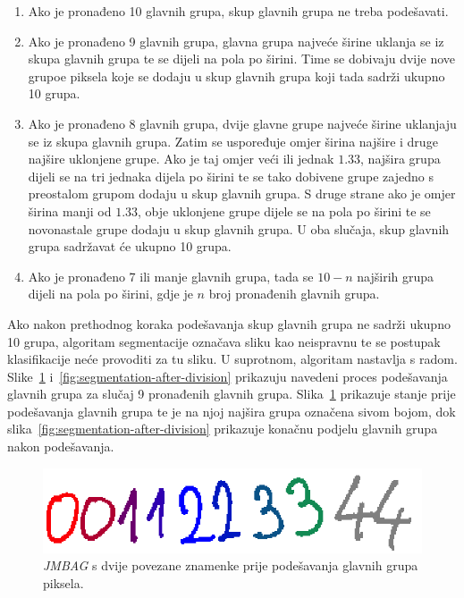 \begin{enumerate}
    \item Ako je pronađeno 10 glavnih grupa, skup glavnih grupa ne treba podešavati.
    \item Ako je pronađeno 9 glavnih grupa, glavna grupa najveće širine uklanja se iz skupa glavnih grupa te se dijeli
    na pola po širini. Time se dobivaju dvije nove grupoe piksela koje se dodaju u skup glavnih grupa koji tada sadrži
    ukupno 10 grupa.
    \item Ako je pronađeno 8 glavnih grupa, dvije glavne grupe najveće širine uklanjaju se iz skupa glavnih grupa.
    Zatim se uspoređuje omjer širina najšire i druge najšire uklonjene grupe. Ako je taj omjer veći ili jednak $1.33$,
    najšira grupa dijeli se na tri jednaka dijela po širini te se tako dobivene grupe zajedno s preostalom grupom dodaju
    u skup glavnih grupa. S druge strane ako je omjer širina manji od $1.33$, obje uklonjene grupe dijele se na pola po
    širini te se novonastale grupe dodaju u skup glavnih grupa. U oba slučaja, skup glavnih grupa sadržavat će ukupno 10
    grupa.
    \item Ako je pronađeno 7 ili manje glavnih grupa, tada se $10 - n$ najširih grupa dijeli na pola po širini, gdje je
    $n$ broj pronađenih glavnih grupa.
\end{enumerate}
Ako nakon prethodnog koraka podešavanja skup glavnih grupa ne sadrži ukupno 10 grupa, algoritam segmentacije označava
sliku kao neispravnu te se postupak klasifikacije neće provoditi za tu sliku. U suprotnom, algoritam nastavlja s radom.
Slike\ \ref{fig:segmentation-before-division} i\ \ref{fig:segmentation-after-division} prikazuju navedeni proces
podešavanja glavnih grupa za slučaj 9 pronađenih glavnih grupa. Slika\ \ref{fig:segmentation-before-division} prikazuje
stanje prije podešavanja glavnih grupa te je na njoj najšira grupa označena sivom bojom, dok
slika\ \ref{fig:segmentation-after-division} prikazuje konačnu podjelu glavnih grupa nakon podešavanja.\\
\begin{figure}[htb]
    \centering
    \includegraphics[width=12cm]{images/segmentation-before-division.png}
    \caption{\emph{JMBAG} s dvije povezane znamenke prije podešavanja glavnih grupa piksela.}
    \label{fig:segmentation-before-division}
\end{figure}
